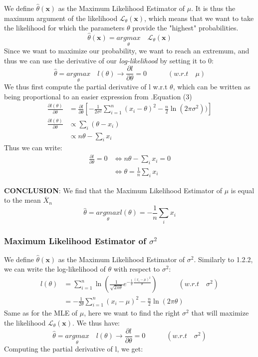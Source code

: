 \documentclass{article}
\begin{document}
We define $\hat{\theta}({\mathbf{x}})$ as the Maximum Likelihood Estimator of $\mu$. It is thus the maximum argument of the likelihood $\mathcal{L}_{\theta}(\mathbf{x})$, which means that we want to take the likelihood for which the parameters $\theta$ provide the "highest" probabilities.
\[
\hat{\theta}({\mathbf{x}}) = \underset{\theta}{argmax}\quad{\mathcal{L}_\theta(\mathbf{x})}
\]
Since we want to maximize our probability, we want to reach an extremum, and thus we can use the derivative of our \textit{log-likelihood} by setting it to 0:
\[
\hat{\theta}= \underset{\theta}{argmax}\quad l(\theta) \longrightarrow \frac{\partial l}{\partial \theta} = 0 \quad\quad\quad (w.r.t \quad \mu)
\]
We thus first compute the partial derivative of l  w.r.t $\theta$, which can be written as being proportional to an easier expression from .Equation (3)
\[
\begin{split}
\frac{\partial l(\theta)}{\partial \theta} & = \frac{\partial l}{\partial \theta}\left[- \frac{1}{2\sigma^2}\sum\limits_{i=1}^{n}(x_i-\theta)^2-\frac{n}{2}\ln(2\pi\sigma^2))\right] \\
\frac{\partial l(\theta)}{\partial \theta} & \propto \sum\limits_i{(\theta-x_i)} \\
& \propto n\theta - \sum\limits_i{x_i}
\end{split}
\]
Thus we can write:
\[
\begin{split}
\frac{\partial l}{\partial \theta} = 0 & \iff n\theta - \sum\limits_i{x_i} = 0 \\
& \iff \theta = \frac{1}{n}\sum\limits_{i}x_i
\end{split}
\]

\textbf{CONCLUSION}: We find that the Maximum Likelihood Estimator of $\mu$ is equal to the mean $\overline{X}_n$
\begin{equation} \label{eq3}
\boxed{
\hat{\theta} = \underset{\theta}{argmax}l(\theta) = - \frac{1}{n}\sum\limits_{i}x_i
}
\end{equation}

\subsubsection{Maximum Likelihood Estimator of $\sigma^2$}

We define $\hat{\theta}({\mathbf{x}})$ as the Maximum Likelihood Estimator of $\sigma^2$.
\newline Similarly to 1.2.2, we can write the log-likelihood of $\theta$ with respect to $\sigma^2$:
\[
\begin{split}
l(\theta) & = \sum\limits_{i=1}^{n}\ln(\frac{1}{\sqrt{2\pi\theta}}e^{-\frac{1}{2}\frac{(x_i-\mu)^2}{\theta}}) \quad\quad\quad (w.r.t \quad \sigma^2) \\
& = - \frac{1}{2\theta}\sum\limits_{i=1}^{n}(x_i-\mu)^2-\frac{n}{2}\ln(2\pi\theta)
\end{split}
\]
Same as for the MLE of $\mu$, here we want to find the right $\sigma^2$ that will maximize the likelihood $\mathcal{L}_\theta(\mathbf{x})$.
\newline We thus have:
\[
\hat{\theta}= \underset{\theta}{argmax}\quad l(\theta) \longrightarrow \frac{\partial l}{\partial \theta} = 0 \quad\quad\quad (w.r.t \quad \sigma^2)
\]
Computing the partial derivative of l, we get:
\end{document}
